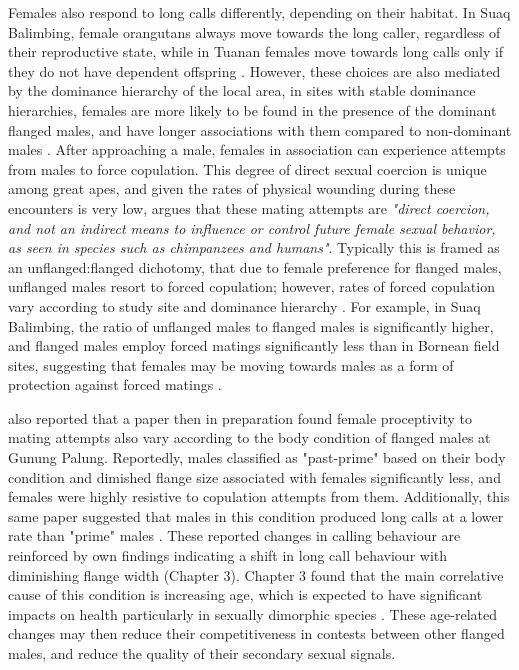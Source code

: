 Females also respond to long calls differently, depending on their habitat. In Suaq Balimbing, female orangutans always move towards the long caller, regardless of their reproductive state, while in Tuanan females move towards long calls only if they do not have dependent offspring \citep{Dunkel.2013, Spillmann.2016}. However, these choices are also mediated by the dominance hierarchy of the local area, in sites with stable dominance hierarchies, females are more likely to be found in the presence of the dominant flanged males, and have longer associations with them compared to non-dominant males \citep{Setia.2008}. After approaching a male, females in association can experience attempts from males to force copulation. This degree of direct sexual coercion is unique among great apes, and given the rates of physical wounding during these encounters is very low, \citet{Knott.2009y9d} argues that these mating attempts are \textit{"direct coercion, and not an indirect means to influence or control future female sexual behavior, as seen in species such as chimpanzees and humans"}. Typically this is framed as an unflanged:flanged dichotomy, that due to female preference for flanged males, unflanged males resort to forced copulation; however, rates of forced copulation vary according to study site and dominance hierarchy \citep{Knott.2008, Knott.2009}. For example, in Suaq Balimbing, the ratio of unflanged males to flanged males is significantly higher, and flanged males employ forced matings significantly less than in Bornean field sites, suggesting that females may be moving towards males as a form of protection against forced matings \citep{Knott.2008}. 

\citet{Knott.2009y9d} also reported that a paper then in preparation found female proceptivity to mating attempts also vary according to the body condition of flanged males at Gunung Palung. Reportedly, males classified as "past-prime" based on their body condition and dimished flange size associated with females significantly less, and females were highly resistive to copulation attempts from them. Additionally, this same paper suggested that males in this condition produced long calls at a lower rate than "prime" males \citep{Knott.2009y9d}. These reported changes in calling behaviour are reinforced by own findings indicating a shift in long call behaviour with diminishing flange width (Chapter 3). Chapter 3 found that the main correlative cause of this condition is increasing age, which is expected to have significant impacts on health particularly in sexually dimorphic species \citep{Beirne.2015}. These age-related changes may then reduce their competitiveness in contests between other flanged males, and reduce the quality of their secondary sexual signals.

